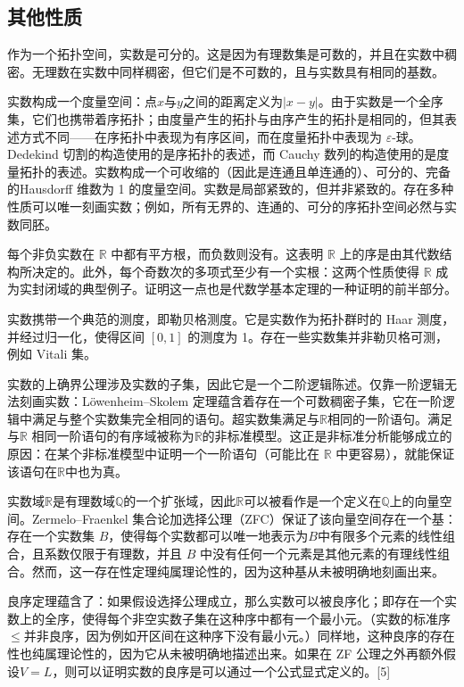 \subsection{其他性质}
作为一个拓扑空间，实数是可分的。这是因为有理数集是可数的，并且在实数中稠密。无理数在实数中同样稠密，但它们是不可数的，且与实数具有相同的基数。

实数构成一个度量空间：点$x$与$y$之间的距离定义为$|x-y|$。由于实数是一个全序集，它们也携带着序拓扑；由度量产生的拓扑与由序产生的拓扑是相同的，但其表述方式不同——在序拓扑中表现为有序区间，而在度量拓扑中表现为 $\varepsilon$-球。Dedekind 切割的构造使用的是序拓扑的表述，而 Cauchy 数列的构造使用的是度量拓扑的表述。实数构成一个可收缩的（因此是连通且单连通的）、可分的、完备的Hausdorff 维数为 1 的度量空间。实数是局部紧致的，但并非紧致的。存在多种性质可以唯一刻画实数；例如，所有无界的、连通的、可分的序拓扑空间必然与实数同胚。

每个非负实数在 $\mathbb{R}$ 中都有平方根，而负数则没有。这表明 $\mathbb{R}$ 上的序是由其代数结构所决定的。此外，每个奇数次的多项式至少有一个实根：这两个性质使得 $\mathbb{R}$ 成为实封闭域的典型例子。证明这一点也是代数学基本定理的一种证明的前半部分。

实数携带一个典范的测度，即勒贝格测度。它是实数作为拓扑群时的 Haar 测度，并经过归一化，使得区间 $[0,1]$ 的测度为 1。存在一些实数集并非勒贝格可测，例如 Vitali 集。

实数的上确界公理涉及实数的子集，因此它是一个二阶逻辑陈述。仅靠一阶逻辑无法刻画实数：Löwenheim–Skolem 定理蕴含着存在一个可数稠密子集，它在一阶逻辑中满足与整个实数集完全相同的语句。超实数集满足与$\mathbb{R}$相同的一阶语句。满足与$\mathbb{R}$ 相同一阶语句的有序域被称为$\mathbb{R}$的非标准模型。这正是非标准分析能够成立的原因：在某个非标准模型中证明一个一阶语句（可能比在 $\mathbb{R}$ 中更容易），就能保证该语句在$\mathbb{R}$中也为真。

实数域$\mathbb{R}$是有理数域$\mathbb{Q}$的一个扩张域，因此$\mathbb{R}$可以被看作是一个定义在$\mathbb{Q}$上的向量空间。Zermelo–Fraenkel 集合论加选择公理（ZFC）保证了该向量空间存在一个基：存在一个实数集 $B$，使得每个实数都可以唯一地表示为$B$中有限多个元素的线性组合，且系数仅限于有理数，并且 $B$ 中没有任何一个元素是其他元素的有理线性组合。然而，这一存在性定理纯属理论性的，因为这种基从未被明确地刻画出来。

良序定理蕴含了：如果假设选择公理成立，那么实数可以被良序化；即存在一个实数上的全序，使得每个非空实数子集在这种序中都有一个最小元。（实数的标准序$\leq$并非良序，因为例如开区间在这种序下没有最小元。）同样地，这种良序的存在性也纯属理论性的，因为它从未被明确地描述出来。如果在 ZF 公理之外再额外假设$V=L$，则可以证明实数的良序是可以通过一个公式显式定义的。[5]

